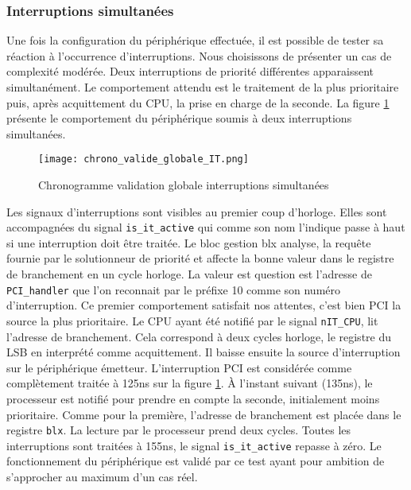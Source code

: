 \subsubsection{Interruptions simultanées}
Une fois la configuration du périphérique effectuée, il est possible de tester sa réaction à l'occurrence d'interruptions.
Nous choisissons de présenter un cas de complexité modérée.
Deux interruptions de priorité différentes apparaissent simultanément.
Le comportement attendu est le traitement de la plus prioritaire puis, après acquittement du CPU, la prise en charge de la seconde.
La figure \ref{fig:chrono_valide_globale_IT} présente le comportement du périphérique soumis à deux interruptions simultanées.
\begin{figure}[H]
    \centering
    \texttt{[image: chrono\_valide\_globale\_IT.png]}
    \caption{Chronogramme validation globale interruptions simultanées}
    \label{fig:chrono_valide_globale_IT}
\end{figure}
Les signaux d'interruptions sont visibles au premier coup d'horloge.
Elles sont accompagnées du signal \texttt{is\_it\_active} qui comme son nom l'indique passe à haut si une interruption doit être traitée.
Le bloc gestion blx analyse, la requête fournie par le solutionneur de priorité et affecte la bonne valeur dans le registre de branchement en un cycle horloge.
La valeur est question est l'adresse de \texttt{PCI\_handler} que l'on reconnait par le préfixe 10 comme son numéro d'interruption.
Ce premier comportement satisfait nos attentes, c'est bien PCI la source la plus prioritaire.
Le CPU ayant été notifié par le signal \texttt{nIT\_CPU}, lit l'adresse de branchement.
Cela correspond à deux cycles horloge, le registre du LSB en interprété comme acquittement.
Il baisse ensuite la source d'interruption sur le périphérique émetteur.
L'interruption PCI est considérée comme complètement traitée à 125ns sur la figure \ref{fig:chrono_valide_globale_IT}.
À l'instant suivant (135ns), le processeur est notifié pour prendre en compte la seconde, initialement moins prioritaire.
Comme pour la première, l'adresse de branchement est placée dans le registre \texttt{blx}.
La lecture par le processeur prend deux cycles.
Toutes les interruptions sont traitées à 155ns, le signal \texttt{is\_it\_active} repasse à zéro.
Le fonctionnement du périphérique est validé par ce test ayant pour ambition de s'approcher au maximum d'un cas réel.
